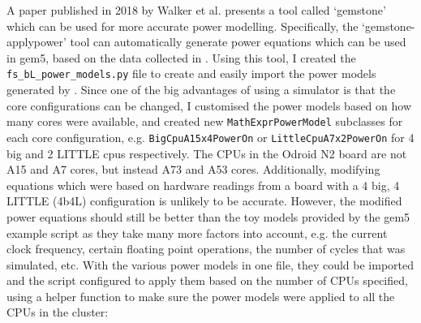     A paper published in 2018 by Walker et al. 
    \cite{walker_hardware-validated_2018} presents a tool called `gemstone' 
    which can be used for more accurate power modelling. Specifically, the 
    `gemstone-applypower' tool \cite{walker_mattw200gemstone-applypower_2018}
    can automatically generate power equations which can be used in gem5, based
    on the data collected in \cite{walker_hardware-validated_2018}. Using this 
    tool, I created the \texttt{fs\_bL\_power\_models.py} file to create and
    easily import the power models generated by 
    \cite{walker_mattw200gemstone-applypower_2018}. Since one of the big 
    advantages of using a simulator is that the core configurations can be 
    changed, I customised the power models based on how many cores were 
    available, and created new \texttt{MathExprPowerModel} subclasses for each 
    core configuration, e.g. \texttt{BigCpuA15x4PowerOn} or 
    \texttt{LittleCpuA7x2PowerOn} for 4 big and 2 LITTLE cpus respectively. The 
    CPUs in the Odroid N2 board are not A15 and A7 cores, but instead A73 and 
    A53 cores. Additionally, modifying equations which were based on hardware 
    readings from a board with a 4 big, 4 LITTLE (4b4L) configuration is 
    unlikely to be accurate. However, the modified power equations should still 
    be better than the toy models provided by the gem5 example script as they 
    take many more factors into account, e.g. the current clock frequency, 
    certain floating point operations, the number of cycles that was simulated, 
    etc. With the various power models in one file, they could be imported and 
    the script configured to apply them based on the number of CPUs specified, 
    using a helper function to make sure the power models were applied to all 
    the CPUs in the cluster:
